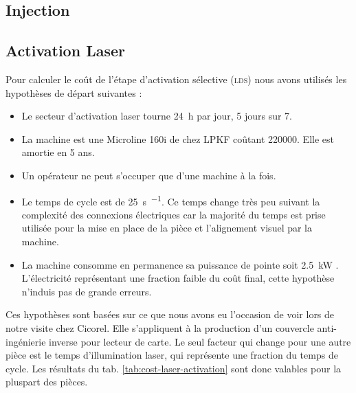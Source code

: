 \subsection{Injection}


\subsection{Activation Laser}
Pour calculer le coût de l'étape d'activation sélective (\textsc{lds}) nous avons utilisés les hypothèses de départ suivantes :
\begin{itemize}
    \item Le secteur d'activation laser tourne \SI{24}{\hour} par jour, 5 jours sur 7.
    \item La machine est une Microline 160i de chez LPKF coûtant \SI{220000}{\chf}.
        Elle est amortie en 5 ans.
    \item Un opérateur ne peut s'occuper que d'une machine à la fois.
    \item Le temps de cycle est de \SI{25}{\second\per\piece}.
        Ce temps change très peu suivant la complexité des connexions électriques car la majorité du temps est prise utilisée pour la mise en place de la pièce et l'alignement visuel par la machine.
    \item La machine consomme en permanence sa puissance de pointe soit \SI{2.5}{\kilo\watt} \cite{lpkf-microline-series}.
        L'électricité représentant une fraction faible du coût final, cette hypothèse n'induis pas de grande erreurs.
\end{itemize}

Ces hypothèses sont basées sur ce que nous avons eu l'occasion de voir lors de notre visite chez Cicorel.
Elle s'appliquent à la production d'un couvercle anti-ingénierie inverse pour lecteur de carte.
Le seul facteur qui change pour une autre pièce est le temps d'illumination laser, qui représente une fraction du temps de cycle.
Les résultats du tab. \ref{tab:cost-laser-activation} sont donc valables pour la pluspart des pièces.


